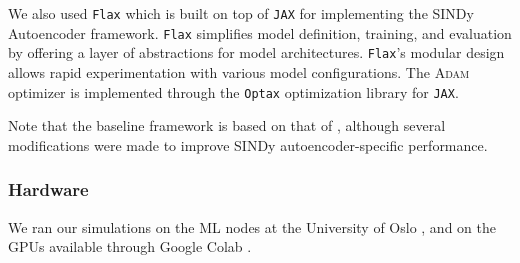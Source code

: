 We also used \verb|Flax| \cite{Flax2020github} which is built on top of \verb|JAX| for implementing the SINDy Autoencoder framework. 
\verb|Flax| simplifies model definition, training, and evaluation by offering a layer of abstractions for model architectures. 
\verb|Flax|’s modular design allows rapid experimentation with various model configurations. 
The \textsc{Adam} optimizer is implemented through the \verb|Optax| \cite{deepmind2020jax} optimization library for \verb|JAX|. 

Note that the baseline framework is based on that of \textcite{lippe2024}, although several modifications were made to improve SINDy autoencoder-specific performance. 

\subsubsection{Hardware}
We ran our simulations on the ML nodes at the University of Oslo \cite{uio_ml_nodes}, and on the GPUs available through Google Colab \cite{googlecolab}. 
